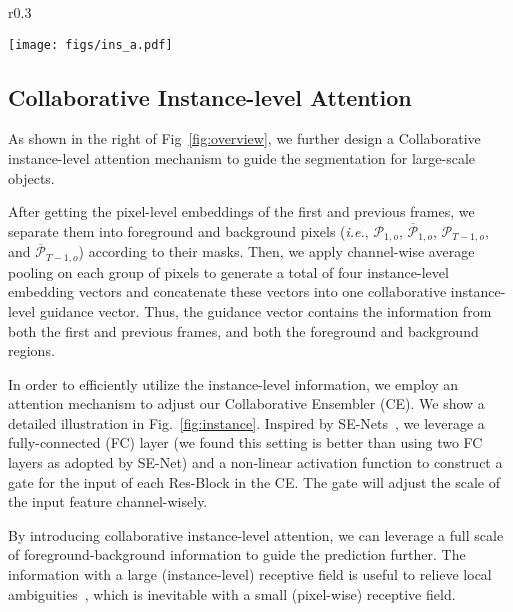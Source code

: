 \documentclass[runningheads]{llncs}
\def\ie{\emph{i.e.}}
\begin{document}
\setlength{\intextsep}{-10pt}
\begin{wrapfigure}[22]{r}{0.3\textwidth}
\center

\texttt{[image: figs/ins\_a.pdf]}

\caption{The trainable part of the instance-level attention. $C_e$ denotes the channel dimension of pixel-wise embedding. $H$, $W$, $C$ denote the height, width, channel dimension of CE features.}
\label{fig:instance}

\end{wrapfigure}

\subsection{Collaborative Instance-level Attention}

As shown in the right of Fig~\ref{fig:overview}, we further design a Collaborative instance-level attention mechanism to guide the segmentation for large-scale objects. 

After getting the pixel-level embeddings of the first and previous frames, we separate them into foreground and background pixels (\ie, $\mathcal{P}_{1,o}$, $\mathcal{\overline{P}}_{1,o}$, $\mathcal{P}_{T-1,o}$, and $\mathcal{\overline{P}}_{T-1,o}$) according to their masks. Then, we apply channel-wise average pooling on each group of pixels to generate a total of four instance-level embedding vectors and concatenate these vectors into one collaborative instance-level guidance vector. Thus, the guidance vector contains the information from both the first and previous frames, and both the foreground and background regions.

\setlength{\intextsep}{0pt}



In order to efficiently utilize the instance-level information, we employ an attention mechanism to adjust our Collaborative Ensembler (CE). We show a detailed illustration in Fig.~\ref{fig:instance}. Inspired by SE-Nets~\cite{senet}, we leverage a fully-connected (FC) layer (we found this setting is better than using two FC layers as adopted by SE-Net) and a non-linear activation function to construct a gate for the input of each Res-Block in the CE. The gate will adjust the scale of the input feature channel-wisely.





By introducing collaborative instance-level attention, we can leverage a full scale of foreground-background information to guide the prediction further. The information with a large (instance-level) receptive field is useful to relieve local ambiguities~\cite{torralba2003contextual}, which is inevitable with a small (pixel-wise) receptive field.
\end{document}
